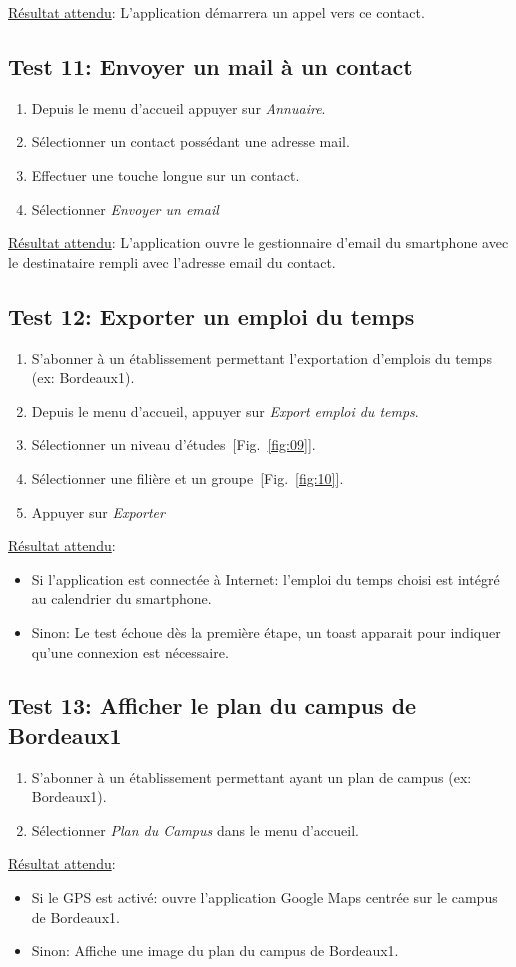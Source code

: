     \underline{Résultat attendu}: L'application démarrera un appel vers ce contact.

  \subsection*{Test 11: Envoyer un mail à un contact}
    \begin{enumerate}
    \item Depuis le menu d'accueil appuyer sur \emph{Annuaire}.
    \item Sélectionner un contact possédant une adresse mail.
    \item Effectuer une touche longue sur un contact.
    \item Sélectionner \emph{Envoyer un email}
    \end{enumerate}

    \underline{Résultat attendu}: L'application ouvre le gestionnaire d'email du smartphone avec le destinataire rempli avec l'adresse email du contact.

  \subsection*{Test 12: Exporter un emploi du temps}
    \begin{enumerate}
    \item S'abonner à un établissement permettant l'exportation d'emplois du temps (ex: Bordeaux1).
    \item Depuis le menu d'accueil, appuyer sur \emph{Export emploi du temps}.
    \item Sélectionner un niveau d'études~[Fig.~\ref{fig:09}].
    \item Sélectionner une filière et un groupe~[Fig.~\ref{fig:10}].
    \item Appuyer sur \emph{Exporter}
    \end{enumerate}

    \underline{Résultat attendu}:
    \begin{itemize}
    \item Si l'application est connectée à Internet: l'emploi du temps choisi est intégré au calendrier du smartphone.
    \item Sinon: Le test échoue dès la première étape, un toast apparait pour indiquer qu'une connexion est nécessaire.
    \end{itemize}

  \subsection*{Test 13: Afficher le plan du campus de Bordeaux1}
    \begin{enumerate}
    \item S'abonner à un établissement permettant ayant un plan de campus (ex: Bordeaux1).
    \item Sélectionner \emph{Plan du Campus} dans le menu d'accueil.
    \end{enumerate}

    \underline{Résultat attendu}:
    \begin{itemize}
    \item Si le GPS est activé: ouvre l'application Google Maps centrée sur le campus de Bordeaux1.
    \item Sinon: Affiche une image du plan du campus de Bordeaux1.
    \end{itemize}
